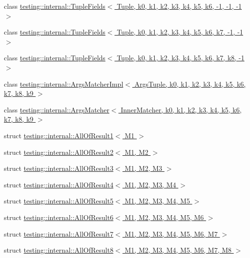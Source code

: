 \begin{DoxyCompactItemize}
\item 
class \hyperlink{classtesting_1_1internal_1_1TupleFields_3_01Tuple_00_01k0_00_01k1_00_01k2_00_01k3_00_01k4_00_01keabdf503bd0192bc35ddb795df95316f}{testing\+::internal\+::\+Tuple\+Fields$<$ Tuple, k0, k1, k2, k3, k4, k5, k6, -\/1, -\/1, -\/1 $>$}
\item 
class \hyperlink{classtesting_1_1internal_1_1TupleFields_3_01Tuple_00_01k0_00_01k1_00_01k2_00_01k3_00_01k4_00_01kb66bdb5aa3faae197a495470a1b8e9d1}{testing\+::internal\+::\+Tuple\+Fields$<$ Tuple, k0, k1, k2, k3, k4, k5, k6, k7, -\/1, -\/1 $>$}
\item 
class \hyperlink{classtesting_1_1internal_1_1TupleFields_3_01Tuple_00_01k0_00_01k1_00_01k2_00_01k3_00_01k4_00_01k478398ee7a3c50306b8ce1483964573e}{testing\+::internal\+::\+Tuple\+Fields$<$ Tuple, k0, k1, k2, k3, k4, k5, k6, k7, k8, -\/1 $>$}
\item 
class \hyperlink{classtesting_1_1internal_1_1ArgsMatcherImpl}{testing\+::internal\+::\+Args\+Matcher\+Impl$<$ Args\+Tuple, k0, k1, k2, k3, k4, k5, k6, k7, k8, k9 $>$}
\item 
class \hyperlink{classtesting_1_1internal_1_1ArgsMatcher}{testing\+::internal\+::\+Args\+Matcher$<$ Inner\+Matcher, k0, k1, k2, k3, k4, k5, k6, k7, k8, k9 $>$}
\item 
struct \hyperlink{structtesting_1_1internal_1_1AllOfResult1}{testing\+::internal\+::\+All\+Of\+Result1$<$ M1 $>$}
\item 
struct \hyperlink{structtesting_1_1internal_1_1AllOfResult2}{testing\+::internal\+::\+All\+Of\+Result2$<$ M1, M2 $>$}
\item 
struct \hyperlink{structtesting_1_1internal_1_1AllOfResult3}{testing\+::internal\+::\+All\+Of\+Result3$<$ M1, M2, M3 $>$}
\item 
struct \hyperlink{structtesting_1_1internal_1_1AllOfResult4}{testing\+::internal\+::\+All\+Of\+Result4$<$ M1, M2, M3, M4 $>$}
\item 
struct \hyperlink{structtesting_1_1internal_1_1AllOfResult5}{testing\+::internal\+::\+All\+Of\+Result5$<$ M1, M2, M3, M4, M5 $>$}
\item 
struct \hyperlink{structtesting_1_1internal_1_1AllOfResult6}{testing\+::internal\+::\+All\+Of\+Result6$<$ M1, M2, M3, M4, M5, M6 $>$}
\item 
struct \hyperlink{structtesting_1_1internal_1_1AllOfResult7}{testing\+::internal\+::\+All\+Of\+Result7$<$ M1, M2, M3, M4, M5, M6, M7 $>$}
\item 
struct \hyperlink{structtesting_1_1internal_1_1AllOfResult8}{testing\+::internal\+::\+All\+Of\+Result8$<$ M1, M2, M3, M4, M5, M6, M7, M8 $>$}

\end{DoxyCompactItemize}
